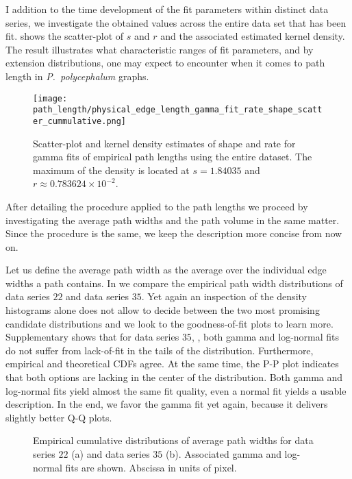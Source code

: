 		I addition to the time development of the fit parameters within distinct data series, we investigate the obtained values across the entire data set that has been fit.  shows the scatter-plot of $s$ and $r$ and the associated estimated kernel density. The result illustrates what characteristic ranges of fit parameters, and by extension distributions, one may expect to encounter when it comes to path length in \emph{P.~polycephalum} graphs.

		\begin{figure}[!htbp]
			\centering
				\texttt{[image: path\_length/physical\_edge\_length\_gamma\_fit\_rate\_shape\_scatter\_cummulative.png]}
			\caption[Path length distribution fit parameter densities.]{Scatter-plot and kernel density estimates of shape and rate for gamma fits of empirical path lengths using the entire dataset. The maximum of the density is located at $s = 1.84035$ and $r \approx 0.783624 \times 10^{-2}$.}
			\label{fig:path_lengths_gamma_fit_kde}
		\end{figure}

		After detailing the procedure applied to the path lengths we proceed by investigating the average path widths and the path volume in the same matter. Since the procedure is the same, we keep the description more concise from now on.

		Let us define the average path width as the average over the individual edge widths a path contains. In  we compare the empirical path width distributions of data series $22$ and data series $35$. Yet again an inspection of the density histograms alone does not allow to decide between the two most promising candidate distributions and we look to the goodness-of-fit plots to learn more. Supplementary  shows that for data series $35$, , both gamma and log-normal fits do not suffer from lack-of-fit in the tails of the distribution. Furthermore, empirical and theoretical CDFs agree. At the same time, the P-P plot indicates that both options are lacking in the center of the distribution. Both gamma and log-normal fits yield almost the same fit quality, even a normal fit yields a usable description. In the end, we favor the gamma fit yet again, because it delivers slightly better Q-Q plots. 

		\begin{figure}
			\centering

			\caption[Path width distributions.]{Empirical cumulative distributions of average path widths for data series $22$ (a) and data series $35$ (b). Associated gamma and log-normal fits are shown. Abscissa in units of pixel.}
			\label{fig:path_widths}
		\end{figure}

